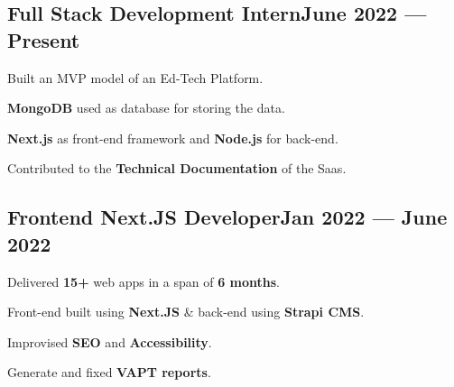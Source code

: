 \subsection{{Full Stack Development Intern\hfill June 2022 --- Present}}
\begin{zitemize}
\item Built an MVP model of an Ed-Tech Platform.
\item \textbf{MongoDB} used as database for storing the data.
\item \textbf{Next.js} as front-end framework and \textbf{Node.js} for back-end.
\item Contributed to the \textbf{Technical Documentation} of the Saas.
\end{zitemize}

\subsection{{Frontend Next.JS Developer\hfill Jan 2022 --- June 2022}}
\begin{zitemize}
\item Delivered \textbf{15+} web apps in a span of \textbf{6 months}.
\item Front-end built using \textbf{Next.JS} \& back-end using \textbf{Strapi CMS}.
\item Improvised \textbf{SEO} and \textbf{Accessibility}.
\item Generate and fixed \textbf{VAPT reports}.
\end{zitemize}

